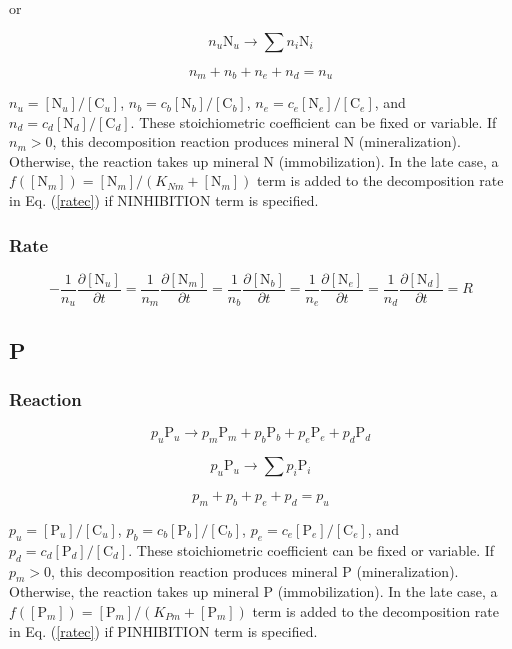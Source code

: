 \documentclass[12pt, a4paper]{article}
\begin{document}
or

\begin{equation}
n_u \text{N}_u \rightarrow \sum n_i \text{N}_i
\end{equation}

\begin{equation}
n_m + n_b + n_e + n_d = n_u
\end{equation}

$n_u = [\text{N}_u]/[\text{C}_u]$, $n_b = c_b[\text{N}_b]/[\text{C}_b]$, $n_e = c_e[\text{N}_e]/[\text{C}_e]$, and $n_d = c_d[\text{N}_d]/[\text{C}_d]$. These stoichiometric coefficient can be fixed or variable. If $n_m > 0$, this decomposition reaction produces mineral N (mineralization). Otherwise, the reaction takes up mineral N (immobilization). In the late case, a $f([\text{N}_m])=[\text{N}_m]/(K_{Nm}+[\text{N}_m])$ term is added to the decomposition rate in Eq. (\ref{ratec}) if NINHIBITION term is specified.
\subsubsection{Rate}
\begin{equation}
-\frac{1}{n_u}\frac{\partial [\text{N}_u]}{\partial t} = \frac{1}{n_m}\frac{\partial [\text{N}_m]}{\partial t} = \frac{1}{n_b} \frac{\partial [\text{N}_b]}{\partial t} = \frac{1}{n_e} \frac{\partial [\text{N}_e]}{\partial t} = \frac{1}{n_d}\frac{\partial [\text{N}_d]}{\partial t} = R
\end{equation}

\subsection{P}
\subsubsection{Reaction}
\begin{equation}
p_u \text{P}_u \rightarrow p_m \text{P}_m + p_b \text{P}_b + p_e \text{P}_e + p_d \text{P}_d
\end{equation}

\begin{equation}
p_u \text{P}_u \rightarrow \sum p_i \text{P}_i
\end{equation}

\begin{equation}
p_m + p_b + p_e + p_d = p_u
\end{equation}

$p_u = [\text{P}_u]/[\text{C}_u]$, $p_b = c_b[\text{P}_b]/[\text{C}_b]$, $p_e = c_e[\text{P}_e]/[\text{C}_e]$, and $p_d = c_d[\text{P}_d]/[\text{C}_d]$. These stoichiometric coefficient can be fixed or variable. If $p_m > 0$, this decomposition reaction produces mineral P (mineralization). Otherwise, the reaction takes up mineral P (immobilization). In the late case, a $f([\text{P}_m])=[\text{P}_m]/(K_{Pm}+[\text{P}_m])$ term is added to the decomposition rate in Eq. (\ref{ratec}) if PINHIBITION term is specified.
\end{document}
